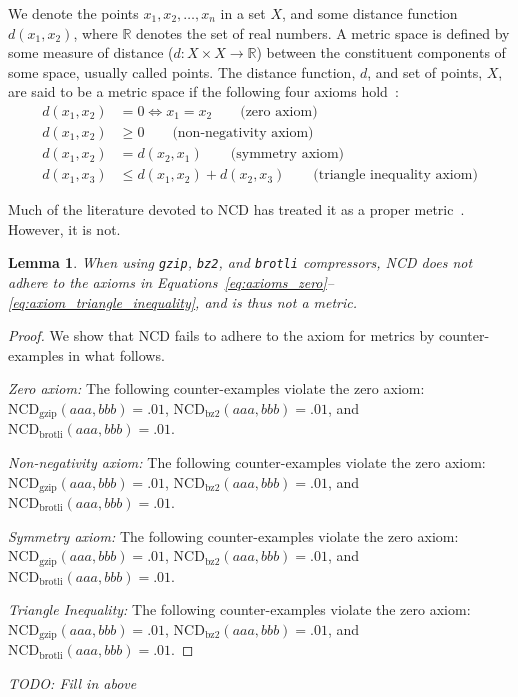 \documentclass[preprint,12pt]{article}
\newcommand{\cm}[1]{\textit{{\color{blue}#1}}}
\newtheorem{lemma}{Lemma}
\begin{document}
We denote the points $x_1,x_2,\ldots,x_n$  in a set $X$, and some distance function $d(x_1,x_2)$, where  $\mathbb{R}$ denotes the set of real numbers. 
A metric space is defined by some measure of distance ($d:X \times X \rightarrow \mathbb{R}$) between the constituent components of some space, usually called points. 
The distance function, $d$, and set of points,  $X$, are said to be a metric space if the following four axioms hold~\cite{metrics}:
\begin{align}
    d(x_1,x_2) &= 0 \iff x_1 = x_2 \qquad\text{(zero axiom)} \label{eq:axioms_zero}\\
    d(x_1,x_2) &\geq 0 \qquad\text{(non-negativity axiom)} \\
    d(x_1,x_2) &= d(x_2, x_1) \qquad\text{(symmetry axiom)} \\
    d(x_1,x_3) & \leq d(x_1,x_2) + d(x_2,x_3) \qquad\text{(triangle inequality axiom)} \label{eq:axiom_triangle_inequality}
\end{align}


Much of the literature devoted to NCD has treated it as a proper metric~\cite{opitz2023gzip,weinreich2023parameter,nishida2011tweet,jiang2022less}. However, it is not.
\begin{lemma}
    When using \texttt{gzip}, \texttt{bz2}, and \texttt{brotli} compressors, NCD does not adhere to the axioms in Equations~\ref{eq:axioms_zero}--\ref{eq:axiom_triangle_inequality}, and is thus not a metric.
\end{lemma}
\begin{proof}
    We show that NCD fails to adhere to the axiom for metrics by counter-examples in what follows.

    \vspace{0.5em}
    \noindent%
    \textit{Zero axiom:} The following counter-examples violate the zero axiom:
    $\text{NCD}_{\text{gzip}}(aaa, bbb) = .01$, $\text{NCD}_{\text{bz2}}(aaa, bbb) = .01 $, and $\text{NCD}_{\text{brotli}}(aaa, bbb) = .01$.

    \vspace{0.5em}
    \noindent%
    \textit{Non-negativity axiom:} The following counter-examples violate the zero axiom:
    $\text{NCD}_{\text{gzip}}(aaa, bbb) = .01$, $\text{NCD}_{\text{bz2}}(aaa, bbb) = .01 $, and $\text{NCD}_{\text{brotli}}(aaa, bbb) = .01$.

    \vspace{0.5em}
    \noindent%
    \textit{Symmetry axiom:} The following counter-examples violate the zero axiom:
    $\text{NCD}_{\text{gzip}}(aaa, bbb) = .01$, $\text{NCD}_{\text{bz2}}(aaa, bbb) = .01 $, and $\text{NCD}_{\text{brotli}}(aaa, bbb) = .01$.

    \vspace{0.5em}
    \noindent%
    \textit{Triangle Inequality:} The following counter-examples violate the zero axiom:
    $\text{NCD}_{\text{gzip}}(aaa, bbb) = .01$, $\text{NCD}_{\text{bz2}}(aaa, bbb) = .01 $, and $\text{NCD}_{\text{brotli}}(aaa, bbb) = .01$.
    
\end{proof}
\cm{TODO: Fill in above}
\end{document}
